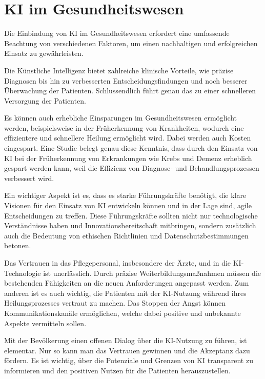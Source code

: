 \chapter{KI im Gesundheitswesen}

Die Einbindung von KI im Gesundheitswesen erfordert eine umfassende Beachtung von verschiedenen Faktoren, um einen nachhaltigen und erfolgreichen Einsatz zu gewährleisten.

\vspace{1mm}Die Künstliche Intelligenz bietet zahlreiche klinische Vorteile, wie präzise Diagnosen bis hin zu verbesserten Entscheidungsfindungen und noch besserer Überwachung der Patienten. Schlussendlich führt genau das zu einer schnelleren Versorgung der Patienten.

\vspace{1mm}Es können auch erhebliche Einsparungen im Gesundheitswesen ermöglicht werden, beispielsweise in der Früherkennung von Krankheiten, wodurch eine effizientere und schnellere Heilung ermöglicht wird. Dabei werden auch Kosten eingespart. Eine Studie belegt genau diese Kenntnis, dass durch den Einsatz von KI bei der Früherkennung von Erkrankungen wie Krebs und Demenz erheblich gespart werden kann, weil die Effizienz von Diagnose- und Behandlungsprozessen verbessert wird.

\vspace{6mm}Ein wichtiger Aspekt ist es, dass es starke Führungskräfte benötigt, die klare Visionen für den Einsatz von KI entwickeln können und in der Lage sind, agile Entscheidungen zu treffen. Diese Führungskräfte sollten nicht nur technologische Verständnisse haben und Innovationsbereitschaft mitbringen, sondern zusätzlich auch die Bedeutung von ethischen Richtlinien und Datenschutzbestimmungen betonen.

\vspace{1mm}Das Vertrauen in das Pflegepersonal, insbesondere der Ärzte, und in die KI-Technologie ist unerlässlich. Durch präzise Weiterbildungsmaßnahmen müssen die bestehenden Fähigkeiten an die neuen Anforderungen angepasst werden. Zum anderen ist es auch wichtig, die Patienten mit der KI-Nutzung während ihres Heilungsprozesses vertraut zu machen. Das Stoppen der Angst können Kommunikationskanäle ermöglichen, welche dabei positive und unbekannte Aspekte vermitteln sollen.

\vspace{1mm}Mit der Bevölkerung einen offenen Dialog über die KI-Nutzung zu führen, ist elementar. Nur so kann man das Vertrauen gewinnen und die Akzeptanz dazu fördern. Es ist wichtig, über die Potenziale und Grenzen von KI transparent zu informieren und den positiven Nutzen für die Patienten herauszustellen.

